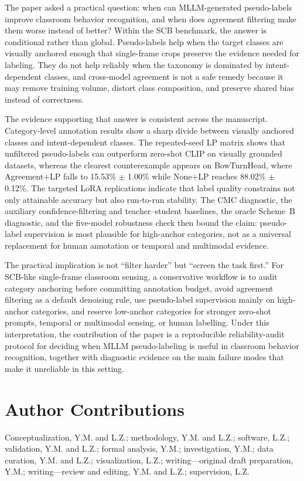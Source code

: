 \documentclass{ieeeaccess}
\begin{document}
The paper asked a practical question: when can MLLM-generated
pseudo-labels improve classroom behavior recognition, and when does
agreement filtering make them worse instead of better?
Within the SCB benchmark, the answer is conditional rather
than global.
Pseudo-labels help when the target classes are visually anchored
enough that single-frame crops preserve the evidence needed for
labeling.
They do not help reliably when the taxonomy is dominated by
intent-dependent classes, and cross-model agreement is not a safe
remedy because it may remove training volume, distort class
composition, and preserve shared bias instead of correctness.

The evidence supporting that answer is consistent across the
manuscript.
Category-level annotation results show a sharp divide between visually
anchored classes and intent-dependent classes.
The repeated-seed LP matrix shows that unfiltered pseudo-labels can
outperform zero-shot CLIP on visually grounded datasets, whereas the
clearest counterexample appears on BowTurnHead, where Agreement+LP
falls to 15.53\% $\pm$ 1.00\% while None+LP reaches 88.02\%
$\pm$ 0.12\%.
The targeted LoRA replications indicate that label quality constrains
not only attainable accuracy but also run-to-run stability.
The CMC diagnostic, the auxiliary confidence-filtering and
teacher--student baselines, the oracle Scheme~B diagnostic, and the
five-model robustness check then bound the claim: pseudo-label
supervision is most plausible for high-anchor categories, not as a
universal replacement for human annotation or temporal and multimodal
evidence.

The practical implication is not ``filter harder'' but
``screen the task first.''
For SCB-like single-frame classroom sensing, a conservative workflow is
to audit category anchoring before committing annotation budget,
avoid agreement filtering as a default denoising rule,
use pseudo-label supervision mainly on high-anchor categories,
and reserve low-anchor categories for stronger zero-shot prompts,
temporal or multimodal sensing, or human labelling.
Under this interpretation, the contribution of the paper is a
reproducible reliability-audit protocol for deciding when MLLM
pseudo-labeling is useful in classroom behavior recognition, together
with diagnostic evidence on the main failure modes that make it
unreliable in this setting.

\section*{Author Contributions}
Conceptualization, Y.M. and L.Z.; methodology, Y.M. and L.Z.; software,
L.Z.; validation, Y.M. and L.Z.; formal analysis, Y.M.; investigation,
Y.M.; data curation, Y.M. and L.Z.; visualization, L.Z.; writing---original
draft preparation, Y.M.; writing---review and editing, Y.M. and L.Z.;
supervision, L.Z.
\end{document}
